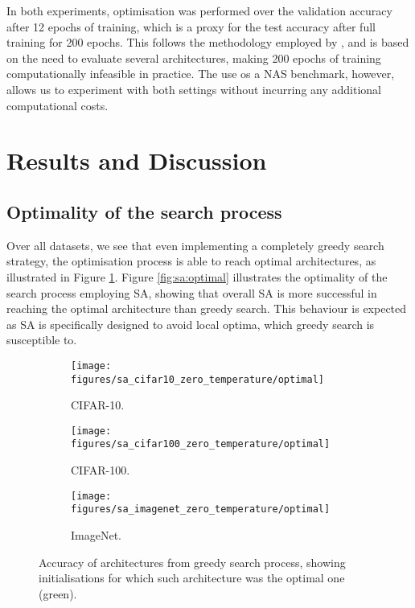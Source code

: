 \documentclass{article}
\begin{document}
In both experiments, optimisation was performed over the validation
accuracy after 12 epochs of training, which is a proxy for the
test accuracy after full training for 200 epochs.
This follows the methodology employed by \cite{nats-bench},
and is based on the need to evaluate several architectures, making
200 epochs of training computationally infeasible in practice.
The use os a NAS benchmark, however, allows us to experiment with
both settings without incurring any additional computational costs.


\section{Results and Discussion}


\subsection{Optimality of the search process}
Over all datasets, we see that even implementing a completely
greedy search strategy, the optimisation process is able to reach
optimal architectures, as illustrated in
Figure \ref{fig:greedy:optimal}.
Figure \ref{fig:sa:optimal} illustrates the optimality of the search
process employing SA, showing that overall SA is more successful in
reaching the optimal architecture than greedy search.
This behaviour is expected as SA is specifically designed to avoid
local optima, which greedy search is susceptible to.

\begin{figure}[hp]
    \begin{subfigure}[b]{0.9\textwidth}
        \centering
        \texttt{[image: figures/sa\_cifar10\_zero\_temperature/optimal]}
        \caption{CIFAR-10.}
    \end{subfigure}
    \hfill
    \begin{subfigure}[b]{0.9\textwidth}
        \centering
        \texttt{[image: figures/sa\_cifar100\_zero\_temperature/optimal]}
        \caption{CIFAR-100.}
    \end{subfigure}
    \hfill
    \begin{subfigure}[b]{0.9\textwidth}
        \centering
        \texttt{[image: figures/sa\_imagenet\_zero\_temperature/optimal]}
        \caption{ImageNet.}
    \end{subfigure}
    \caption{
        Accuracy of architectures from greedy search process,
        showing initialisations for which such architecture was
        the optimal one (green).
    }
    \label{fig:greedy:optimal}
\end{figure}
\end{document}
